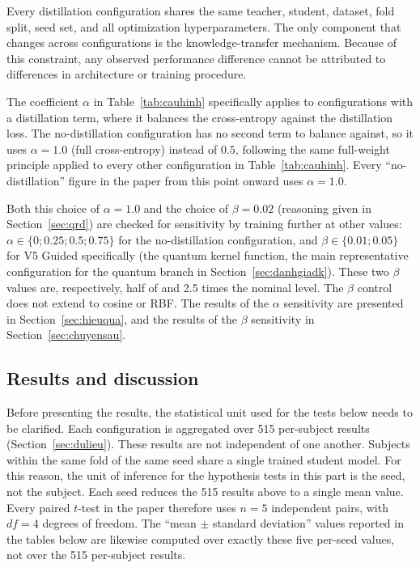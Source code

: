 Every distillation configuration shares the same teacher, student,
dataset, fold split, seed set, and all optimization hyperparameters.
The only component that changes across configurations is the
knowledge-transfer mechanism. Because of this constraint, any
observed performance difference cannot be attributed to differences
in architecture or training procedure.

The coefficient $\alpha$ in Table~\ref{tab:cauhinh} specifically
applies to configurations with a distillation term, where it
balances the cross-entropy against the distillation loss. The
no-distillation configuration has no second term to balance against,
so it uses $\alpha = 1.0$ (full cross-entropy) instead of $0.5$,
following the same full-weight principle applied to every other
configuration in Table~\ref{tab:cauhinh}. Every ``no-distillation''
figure in the paper from this point onward uses $\alpha = 1.0$.

Both this choice of $\alpha = 1.0$ and the choice of $\beta = 0.02$
(reasoning given in Section~\ref{sec:qrd}) are checked for
sensitivity by training further at other values:
$\alpha \in \{0; 0.25; 0.5; 0.75\}$ for the no-distillation
configuration, and $\beta \in \{0.01; 0.05\}$ for V5 Guided
specifically (the quantum kernel function, the main representative
configuration for the quantum branch in Section~\ref{sec:danhgiadk}).
These two $\beta$ values are, respectively, half of and 2.5 times
the nominal level. The $\beta$ control does not extend to cosine or
RBF. The results of the $\alpha$ sensitivity are presented in
Section~\ref{sec:hieuqua}, and the results of the $\beta$ sensitivity
in Section~\ref{sec:chuyensau}.

\subsection{Results and discussion}
\label{sec:ketqua}

Before presenting the results, the statistical unit used for the
tests below needs to be clarified. Each configuration is aggregated
over 515 per-subject results (Section~\ref{sec:dulieu}). These
results are not independent of one another. Subjects within the same
fold of the same seed share a single trained student model. For this
reason, the unit of inference for the hypothesis tests in this part
is the seed, not the subject. Each seed reduces the 515 results
above to a single mean value. Every paired $t$-test in the paper
therefore uses $n = 5$ independent pairs, with $df = 4$ degrees of
freedom. The ``mean $\pm$ standard deviation'' values reported in
the tables below are likewise computed over exactly these five
per-seed values, not over the 515 per-subject results.

